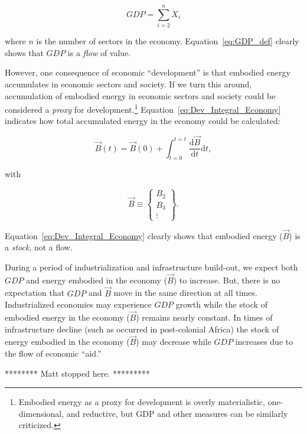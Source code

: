 \begin{equation} \label{eq:GDP_def}
	GDP
	= \sum\limits_{i=2}^{n} \dot{X}_{i}
\end{equation}

\noindent{}where $n$ is the number of sectors in the economy.
Equation~\ref{eq:GDP_def} clearly shows that 
$GDP$ is a \emph{flow} of value.

However, one consequence of economic ``development'' 
is that embodied energy accumulates 
in economic sectors and society. 
If we turn this around, 
accumulation of embodied energy in economic sectors and society 
could be considered a \emph{proxy} for development.\footnote{Embodied energy 
as a proxy for development is overly materialistic, 
one-dimensional, and reductive, 
but GDP and other measures can be similarly criticized.}
Equation~\ref{eq:Dev_Integral_Economy} indicates how total accumulated
energy in the economy could be calculated:

\begin{equation} \label{eq:Dev_Integral_Economy}
	\vec{B}(t) 
	= \vec{B}(0) 
	+ \int_{t=0}^{t=t} \frac{\mathrm{d}\vec{B}}{\mathrm{d}t}\mathrm{d}t,
\end{equation}

\noindent{}with

\begin{equation}
	\vec{B}
	\equiv 
	\begin{Bmatrix}
		B_{2}	\\
		B_{3}	\\
		\vdots
	\end{Bmatrix}.
\end{equation}

\noindent{}Equation~\ref{eq:Dev_Integral_Economy} clearly shows
that embodied energy ($\vec{B}$) is a \emph{stock}, not a flow.

During a period of industrialization and infrastructure build-out, 
we expect both $GDP$ and energy embodied in the economy ($\vec{B}$)
to increase.
But, there is no expectation that $GDP$ and $\vec{B}$ move 
in the same direction at all times.
Industrialized economies may experience $GDP$ growth while 
the stock of embodied energy in the economy ($\vec{B}$) remains nearly constant.
In times of infrastructure decline (such as occurred in post-colonial Africa)
the stock of energy embodied in the economy ($\vec{B}$) may decrease while
$GDP$ increases due to the flow of economic ``aid.''

******** Matt stopped here. *********


